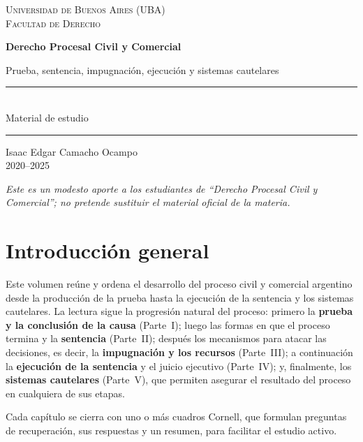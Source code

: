 \documentclass[12pt,oneside]{book}
\newcommand{\universidad}{Universidad de Buenos Aires (UBA)}
\newcommand{\facultad}{Facultad de Derecho}
\newcommand{\titulo}{Derecho Procesal Civil y Comercial}
\newcommand{\subtitulo}{Prueba, sentencia, impugnación, ejecución y sistemas cautelares}
\newcommand{\autor}{Isaac Edgar Camacho Ocampo}
\newcommand{\anio}{2020--2025}
\begin{document}
\begin{titlepage}
\thispagestyle{empty}
\begin{center}
\vspace*{1cm}
{\large \textsc{\universidad}}\\[0.2cm]
{\large \textsc{\facultad}}
\vspace{3cm}

{\Huge \textbf{\titulo}}
\vspace{0.8cm}

{\Large \subtitulo}
\vspace{1.2cm}

\rule{0.70\textwidth}{0.5pt}\\[0.4cm]
{\large Material de estudio}\\[0.4cm]
\rule{0.70\textwidth}{0.5pt}
\vfill
{\large \autor}\\[0.3cm]
{\large \anio}
\end{center}
\vfill
\begin{flushleft}
\textit{Este es un modesto aporte a los estudiantes de ``Derecho Procesal Civil y Comercial''; no pretende sustituir el material oficial de la materia.}
\end{flushleft}
\end{titlepage}

\frontmatter
\tableofcontents
\mainmatter

\chapter*{Introducción general}
Este volumen reúne y ordena el desarrollo del proceso civil y comercial argentino desde la producción de la prueba hasta la ejecución de la sentencia y los sistemas cautelares. La lectura sigue la progresión natural del proceso: primero la \textbf{prueba y la conclusión de la causa} (Parte~I); luego las formas en que el proceso termina y la \textbf{sentencia} (Parte~II); después los mecanismos para atacar las decisiones, es decir, la \textbf{impugnación y los recursos} (Parte~III); a continuación la \textbf{ejecución de la sentencia} y el juicio ejecutivo (Parte~IV); y, finalmente, los \textbf{sistemas cautelares} (Parte~V), que permiten asegurar el resultado del proceso en cualquiera de sus etapas.

Cada capítulo se cierra con uno o más cuadros Cornell, que formulan preguntas de recuperación, sus respuestas y un resumen, para facilitar el estudio activo.
\end{document}
